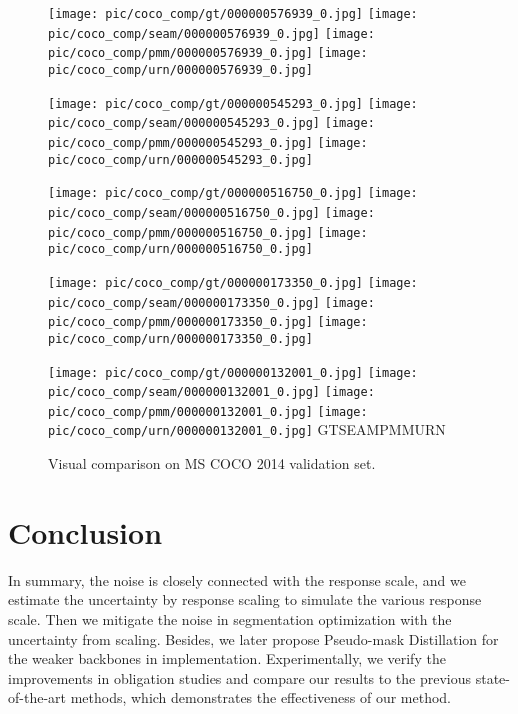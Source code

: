 \begin{figure}[h!]
\begin{centering}
\texttt{[image: pic/coco\_comp/gt/000000576939\_0.jpg]} \texttt{[image: pic/coco\_comp/seam/000000576939\_0.jpg]} \texttt{[image: pic/coco\_comp/pmm/000000576939\_0.jpg]}
\texttt{[image: pic/coco\_comp/urn/000000576939\_0.jpg]}

\texttt{[image: pic/coco\_comp/gt/000000545293\_0.jpg]} \texttt{[image: pic/coco\_comp/seam/000000545293\_0.jpg]} \texttt{[image: pic/coco\_comp/pmm/000000545293\_0.jpg]}
\texttt{[image: pic/coco\_comp/urn/000000545293\_0.jpg]}

\texttt{[image: pic/coco\_comp/gt/000000516750\_0.jpg]} \texttt{[image: pic/coco\_comp/seam/000000516750\_0.jpg]} \texttt{[image: pic/coco\_comp/pmm/000000516750\_0.jpg]}
\texttt{[image: pic/coco\_comp/urn/000000516750\_0.jpg]}

\texttt{[image: pic/coco\_comp/gt/000000173350\_0.jpg]} \texttt{[image: pic/coco\_comp/seam/000000173350\_0.jpg]} \texttt{[image: pic/coco\_comp/pmm/000000173350\_0.jpg]}
\texttt{[image: pic/coco\_comp/urn/000000173350\_0.jpg]}

\texttt{[image: pic/coco\_comp/gt/000000132001\_0.jpg]} \texttt{[image: pic/coco\_comp/seam/000000132001\_0.jpg]} \texttt{[image: pic/coco\_comp/pmm/000000132001\_0.jpg]}
\texttt{[image: pic/coco\_comp/urn/000000132001\_0.jpg]}
\hspace*{0.25cm}GT\hspace*{1.2cm}SEAM\hspace*{1.2cm}PMM\hspace*{1.2cm}URN
\par\end{centering}
\begin{centering}
\caption{Visual comparison on MS COCO 2014 validation set.}
\label{fig:coco_vis} 
\par\end{centering}
\centering{} 
\vspace{-4mm}
\end{figure}

\section{Conclusion}


In summary, the noise is closely connected with the response scale, and we estimate the uncertainty by response scaling to simulate the various response scale. Then we mitigate the noise in segmentation optimization with the uncertainty from scaling. Besides, we later propose Pseudo-mask Distillation for the weaker backbones in implementation. Experimentally, we verify the improvements in obligation studies and compare our results to the previous state-of-the-art methods, which demonstrates the effectiveness of our method.
